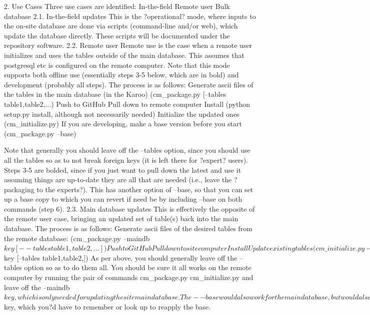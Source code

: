 \documentclass{article}
\begin{document}
2. Use Cases
Three use cases are identified:
In-the-field
Remote user
Bulk database
2.1. In-the-field updates
This is the ?operational? mode, where inputs to the on-site database are done via scripts (command-line and/or web), which update the database directly.  These scripts will be documented under the repository software.
2.2. Remote user
Remote use is the case when a remote user initializes and uses the tables outside of the main database.  This assumes that postgresql etc is configured on the remote computer.  Note that this mode supports both offline use (essentially steps 3-5 below, which are in bold) and development (probably all steps).  The process is as follows: 
Generate ascii files of the tables in the main database (in the Karoo)
      	(cm\_package.py [--tables table1,table2,...)
Push to GitHub
Pull down to remote computer
Install (python setup.py install, although not necessarily needed)
Initialize the updated ones (cm\_initialize.py)
If you are developing, make a base version before you start
(cm\_package.py --base)

Note that generally you should leave off the --tables option, since you should use all the tables so as to not break foreign keys (it is left there for ?expert? users).  Steps 3-5 are bolded, since if you just want to pull down the latest and use it assuming things are up-to-date they are all that are needed (i.e., leave the ?packaging to the experts?).
	This has another option of --base, so that you can set up a base copy to which you can revert if need be by including --base on both commands (step 6).
2.3. Main database updates
This is effectively the opposite of the remote user case, bringing an updated set of table(s) back into the main database.  The process is as follows:
Generate ascii files of the desired tables from the remote database: 
(cm\_package.py --maindb $key [--tables table1,table2,...])
Push to GitHub
Pull down to site computer
Install
Update existing tables 
(cm\_initialize.py --maindb $key [--tables table1,table2,])
As per above, you should generally leave off the --tables option so as to do them all.  You should be sure it all works on the remote computer by running the pair of commands
cm\_package.py
cm\_initialize.py 
and leave off the --maindb $key, which is only needed for updating the site main database.  The --base would also work for the main database, but would also require --maindb $key, which you?d have to remember or look up to reapply the base.
\end{document}
